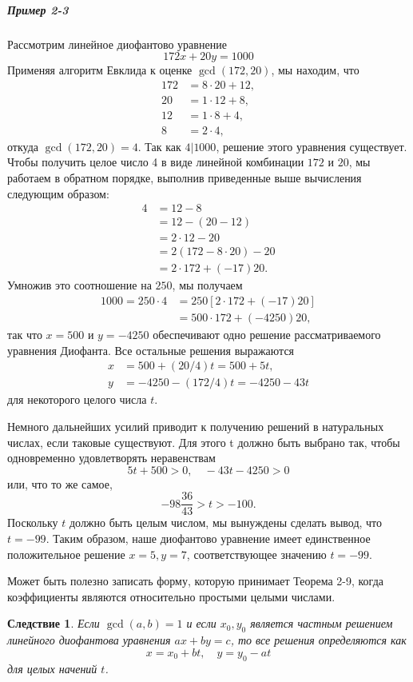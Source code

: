 \documentclass[11pt]{article}
\newtheorem*{corollary}{Следствие}
\begin{document}
\subparagraph{Пример 2-3}
Рассмотрим линейное диофантово уравнение
\[172x + 20y = 1000\]
Применяя алгоритм Евклида к оценке $\gcd(172, 20)$, мы находим, что
\[\begin{split}
	172 & = 8 \cdot 20 + 12,\\
	20 & = 1 \cdot 12 + 8,\\
	12 & = 1 \cdot 8 + 4,\\
	8 & = 2 \cdot 4,
\end{split}\]
откуда $\gcd(172, 20) = 4$. Так как $4 | 1000$, решение этого уравнения существует. Чтобы получить целое число 4 в виде линейной комбинации $172$ и $20$, мы работаем в обратном порядке, выполнив приведенные выше вычисления следующим образом:
\[\begin{split}
	4 & = 12 - 8\\
	& = 12 - (20 -12)\\
	& = 2 \cdot 12 - 20\\
	& = 2(172 - 8 \cdot 20) - 20\\
	& = 2 \cdot 172 + (-17)20.
\end{split}\]
Умножив это соотношение на $250$, мы получаем
\[\begin{split}
	1000  = 250 \cdot 4 & = 250[2 \cdot 172 + (-17)20]\\
	& = 500 \cdot 172 + (-4250)20,
\end{split}\]
так что $x = 500$ и $y = -4250$ обеспечивают одно решение рассматриваемого уравнения Диофанта. Все остальные решения выражаются
\[\begin{split}
	x & = 500 + (20 / 4)t = 500 + 5t,\\
	y & = -4250 - (172/4)t = -4250 - 43t
\end{split}\]
для некоторого целого числа $t$.

\qquad Немного дальнейших усилий приводит к получению решений в натуральных числах, если таковые существуют. Для этого t должно быть выбрано так, чтобы одновременно удовлетворять неравенствам
\[5t + 500 > 0, \quad -43t - 4250 > 0\]
или, что то же самое,
\[-98\frac{36}{43} > t > -100.\]
Поскольку $t$ должно быть целым числом, мы вынуждены сделать вывод, что $t = -99$. Таким образом, наше диофантово уравнение имеет единственное положительное решение $x = 5, y = 7$, соответствующее значению $t = -99$.

Может быть полезно записать форму, которую принимает Теорема 2-9, когда коэффициенты являются относительно простыми целыми числами.

\begin{corollary}
	Если $\gcd(a, b) = 1$ и если $x_0, y_0$ является частным решением линейного диофантова уравнения $ax + by = c$, то все решения определяются как
	\[x = x_0 + bt, \quad y = y_0 - at\]
	для целых начений $t$.
\end{corollary}
\end{document}
